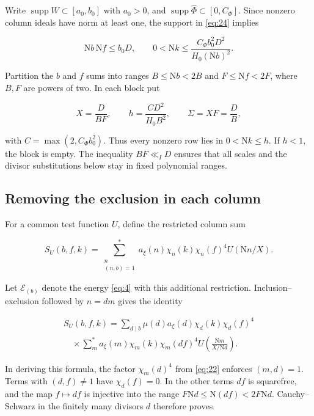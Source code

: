 \documentclass[reqno,a4paper,11pt]{amsart}
\begin{document}
Write $\operatorname{supp}W\subset[a_0,b_0]$ with $a_0>0$, and $\operatorname{supp}\widehat{\Phi}\subset[0,C_\Phi]$. Since nonzero column ideals have norm at least one, the support in \eqref{eq:24} implies

\begin{equation}\label{eq:support-ranges}
\mathrm{N}b\,\mathrm{N}f\le b_0D,\qquad 0<\mathrm{N}k\le\frac{C_\Phi b_0^2D^2}{H_0(\mathrm{N}b)^2}.
\end{equation}

Partition the $b$ and $f$ sums into ranges $B\le\mathrm{N}b<2B$ and $F\le\mathrm{N}f<2F$, where $B,F$ are powers of two. In each block put

\begin{equation}\label{eq:25}
X=\frac{D}{BF},\qquad h=\frac{CD^2}{H_0B^2},\qquad\Sigma=XF=\frac{D}{B},
\end{equation}

with $C=\max(2,C_\Phi b_0^2)$. Thus every nonzero row lies in $0<\mathrm{N}k\le h$. If $h<1$, the block is empty. The inequality $BF\ll_I D$ ensures that all scales and the divisor substitutions below stay in fixed polynomial ranges.

\subsection*{Removing the exclusion in each column}

For a common test function $U$, define the restricted column sum

\begin{equation}\label{eq:restricted-column}
S_U(b,f,k)=\sum_{\substack{n\\(n,b)=1}}^*a_\xi(n)\chi_n(k)\chi_n(f)^4U(\mathrm{N}n/X).
\end{equation}

Let $\mathcal{E}_{(b)}$ denote the energy \eqref{eq:4} with this additional restriction. Inclusion--exclusion followed by $n=dm$ gives the identity

\begin{equation}\label{eq:column-exclusion-identity}
\begin{gathered}
S_U(b,f,k)=\sum_{d\mid b}\mu(d)a_\xi(d)\chi_d(k)\chi_d(f)^4 \\ \quad\times\sum_m^*a_\xi(m)\chi_m(k)\chi_m(df)^4U\left(\frac{\mathrm{N}m}{X/\mathrm{N}d}\right).
\end{gathered}
\end{equation}

In deriving this formula, the factor $\chi_m(d)^4$ from \eqref{eq:22} enforces $(m,d)=1$. Terms with $(d,f)\ne1$ have $\chi_d(f)=0$. In the other terms $df$ is squarefree, and the map $f\mapsto df$ is injective into the range $F\mathrm{N}d\le\mathrm{N}(df)<2F\mathrm{N}d$. Cauchy--Schwarz in the finitely many divisors $d$ therefore proves
\end{document}
